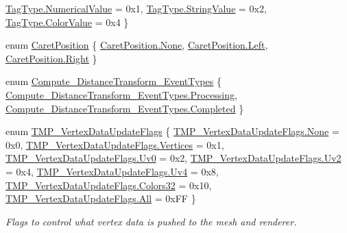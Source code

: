 \begin{DoxyCompactItemize}
\mbox{\hyperlink{namespace_t_m_pro_a3a02df19cfabd98e98ddde29b9c3cbdea4bd29445f343ee08aabed8c83c64f046}{Tag\+Type.\+Numerical\+Value}} = 0x1, 
\mbox{\hyperlink{namespace_t_m_pro_a3a02df19cfabd98e98ddde29b9c3cbdeaf6d2b0e17b94cf73adf2a5be1f0ca160}{Tag\+Type.\+String\+Value}} = 0x2, 
\mbox{\hyperlink{namespace_t_m_pro_a3a02df19cfabd98e98ddde29b9c3cbdeacce4f6bbe06c14f98350c773d340f169}{Tag\+Type.\+Color\+Value}} = 0x4
 \}
\item 
enum \mbox{\hyperlink{namespace_t_m_pro_af5c53a4799a78487e0d1ab886f3c97bc}{Caret\+Position}} \{ \mbox{\hyperlink{namespace_t_m_pro_af5c53a4799a78487e0d1ab886f3c97bca6adf97f83acf6453d4a6a4b1070f3754}{Caret\+Position.\+None}}, 
\mbox{\hyperlink{namespace_t_m_pro_af5c53a4799a78487e0d1ab886f3c97bca945d5e233cf7d6240f6b783b36a374ff}{Caret\+Position.\+Left}}, 
\mbox{\hyperlink{namespace_t_m_pro_af5c53a4799a78487e0d1ab886f3c97bca92b09c7c48c520c3c55e497875da437c}{Caret\+Position.\+Right}}
 \}
\item 
enum \mbox{\hyperlink{namespace_t_m_pro_af6aadc6d9f8a76a743cd456760e57316}{Compute\+\_\+\+Distance\+Transform\+\_\+\+Event\+Types}} \{ \mbox{\hyperlink{namespace_t_m_pro_af6aadc6d9f8a76a743cd456760e57316a643562a9ae7099c8aabfdc93478db117}{Compute\+\_\+\+Distance\+Transform\+\_\+\+Event\+Types.\+Processing}}, 
\mbox{\hyperlink{namespace_t_m_pro_af6aadc6d9f8a76a743cd456760e57316a07ca5050e697392c9ed47e6453f1453f}{Compute\+\_\+\+Distance\+Transform\+\_\+\+Event\+Types.\+Completed}}
 \}
\item 
enum \mbox{\hyperlink{namespace_t_m_pro_a517464fab2ef7ff5b9658d2acaf49a57}{T\+M\+P\+\_\+\+Vertex\+Data\+Update\+Flags}} \{ \newline
\mbox{\hyperlink{namespace_t_m_pro_a517464fab2ef7ff5b9658d2acaf49a57a6adf97f83acf6453d4a6a4b1070f3754}{T\+M\+P\+\_\+\+Vertex\+Data\+Update\+Flags.\+None}} = 0x0, 
\mbox{\hyperlink{namespace_t_m_pro_a517464fab2ef7ff5b9658d2acaf49a57ae4bb6129669488aedeeb0ae27bb91770}{T\+M\+P\+\_\+\+Vertex\+Data\+Update\+Flags.\+Vertices}} = 0x1, 
\mbox{\hyperlink{namespace_t_m_pro_a517464fab2ef7ff5b9658d2acaf49a57ad4ae3de5c415b6c85ca758a4b9f42c2f}{T\+M\+P\+\_\+\+Vertex\+Data\+Update\+Flags.\+Uv0}} = 0x2, 
\mbox{\hyperlink{namespace_t_m_pro_a517464fab2ef7ff5b9658d2acaf49a57ac8500f966c60dd5753e39bee3789cfe8}{T\+M\+P\+\_\+\+Vertex\+Data\+Update\+Flags.\+Uv2}} = 0x4, 
\newline
\mbox{\hyperlink{namespace_t_m_pro_a517464fab2ef7ff5b9658d2acaf49a57afd2611d327cf011675ed9433d0ad6927}{T\+M\+P\+\_\+\+Vertex\+Data\+Update\+Flags.\+Uv4}} = 0x8, 
\mbox{\hyperlink{namespace_t_m_pro_a517464fab2ef7ff5b9658d2acaf49a57aa3eed74bb3b060c542b1701b0cc62e48}{T\+M\+P\+\_\+\+Vertex\+Data\+Update\+Flags.\+Colors32}} = 0x10, 
\mbox{\hyperlink{namespace_t_m_pro_a517464fab2ef7ff5b9658d2acaf49a57ab1c94ca2fbc3e78fc30069c8d0f01680}{T\+M\+P\+\_\+\+Vertex\+Data\+Update\+Flags.\+All}} = 0x\+FF
 \}
\begin{DoxyCompactList}\small\item\em Flags to control what vertex data is pushed to the mesh and renderer. \end{DoxyCompactList}\end{DoxyCompactItemize}


